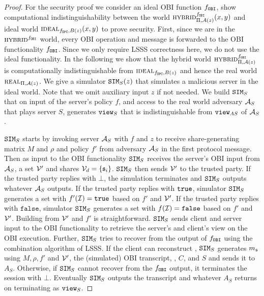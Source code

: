 \begin{proof}
For the security proof we consider an ideal \ac{OBI} function $f_\mathtt{OBI}$, \ie show computational indistinguishability between the world $\HYBRID^{f_\OBI}_{\Pi, \cA(z)} (x, y)$ and ideal world $\IDEAL_{f_\SPC, B(z)}(x, y)$ to prove security. 
First, since we are in the $\HYBRID^{f_\OBI}$ world, every \ac{OBI} operation and message is forwarded to the \ac{OBI} functionality $f_\mathtt{OBI}$.
Since we only require \ac{LSSS} correctness here, we do not use the ideal functionality.
In the following we show that the hybrid world $\HYBRID^{f_\OBI}_{\Pi, \cA(z)}$ is computationally indistinguishable from $\IDEAL_{f_\SPC, B(z)}$ and hence the real world $\REAL_{\Pi, \cA(z)}$. 
We give a simulator $\mathtt{SIM}_S(z)$ that simulates a malicious server in the ideal world. 
Note that we omit auxiliary input $z$ if not needed. 
We build $\mathtt{SIM}_S$ that on input of the server's policy $f$, and access to the real world adversary $\mathcal{A}_S$ that plays server $S$, generates $\mathtt{view}_S$ that is indistinguishable from $\mathtt{view}_{AS}$ of $\mathcal{A}_S$.

$\mathtt{SIM}_S$ starts by invoking server $\mathcal{A}_S$ with $f$ and $z$ to receive share-generating matrix $M$ and $\rho$ and policy $f'$ from adversary $\mathcal{A}_S$ in the first protocol message. 
Then as input to the \ac{OBI} functionality $\mathtt{SIM}_S$ receives the server's \ac{OBI} input  from $\mathcal{A}_S$, \ie a set $\mathcal{V}'$ and shares $\mathcal{V}_d=\{\mathfrak{s}_i\}$. 
$\mathtt{SIM}_S$ then sends $\mathcal{V}'$ to the trusted party. 
If the trusted party replies with $\bot$, the simulation terminates and $\mathtt{SIM}_S$ outputs whatever $\mathcal{A}_S$ outputs. 
If the trusted party replies with $\mathtt{true}$, 
simulator $\mathtt{SIM}_S$ generates a set \ClientSet with $f'(\mathcal{I})=\mathtt{true}$ based on $f'$ and $\mathcal{V}'$. 
If the trusted party replies with $\texttt{false}$, simulator $\mathtt{SIM}_S$ generates a set \ClientSet with $f(\mathcal{I})=\texttt{false}$ based on $f'$ and $\mathcal{V}'$. 
Building \ClientSet from $\mathcal{V}'$ and $f'$ is straightforward. 
$\mathtt{SIM}_S$ sends client and server input to the \ac{OBI} functionality to retrieve the server's and client's view on the \ac{OBI} execution. 
Further, $\mathtt{SIM}_S$ tries to recover \secret from the output of $f_\mathtt{OBI}$ using the combination algorithm of \ac{LSSS}. 
If the client can reconstruct \secret, $\mathtt{SIM}_S$ generates $m_\mathfrak{s}$ using $M, \rho, f'$ and $\mathcal{V}'$, the (simulated) \ac{OBI} transcript, \secret, $C$, and $S$ and sends it to $A_S$. 
Otherwise, if $\mathtt{SIM}_S$ cannot recover \secret from the $f_\mathtt{OBI}$ output, it terminates the session with $\bot$.
Eventually $\mathtt{SIM}_S$ outputs the transcript and whatever $A_S$ returns on terminating as $\mathtt{view}_S$.


\end{proof}
